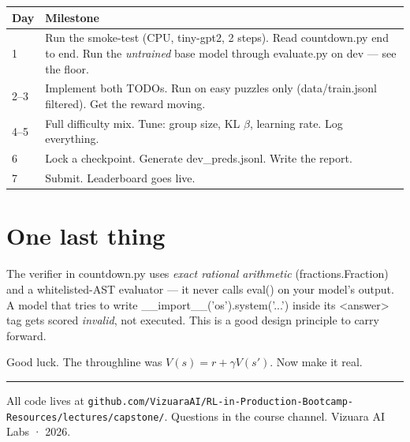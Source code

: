 \documentclass[11pt]{article}
\newcommand{\codesm}[1]{{\ttfamily\footnotesize #1}}
\begin{document}
\begin{center}
\renewcommand{\arraystretch}{1.32}
\begin{tabular}{l p{11cm}}
\toprule
\textbf{Day} & \textbf{Milestone} \\
\midrule
1 & Run the smoke-test (CPU, tiny-gpt2, 2 steps). Read \codesm{countdown.py} end to end.
    Run the \emph{untrained} base model through \codesm{evaluate.py} on dev --- see the floor. \\
2--3 & Implement both TODOs. Run on easy puzzles only (\codesm{data/train.jsonl} filtered).
       Get the reward moving. \\
4--5 & Full difficulty mix. Tune: group size, KL $\beta$, learning rate. Log everything. \\
6 & Lock a checkpoint. Generate \codesm{dev\_preds.jsonl}. Write the report. \\
7 & Submit. Leaderboard goes live. \\
\bottomrule
\end{tabular}
\end{center}

\section*{One last thing}

\vfill
The verifier in \codesm{countdown.py} uses \emph{exact rational arithmetic} (\codesm{fractions.Fraction})
and a whitelisted-AST evaluator --- it never calls \codesm{eval()} on your model's output.
A model that tries to write \codesm{\_\_import\_\_('os').system('...')} inside its \codesm{<answer>}
tag gets scored \emph{invalid}, not executed.
This is a good design principle to carry forward.

Good luck.
The throughline was $V(s) = r + \gamma V(s')$.
Now make it real.

\vspace{0.5cm}
{\color{ink3}\rule{\textwidth}{0.4pt}}
\vspace{0.1cm}
{\sans\footnotesize\color{ink3}
All code lives at \texttt{github.com/VizuaraAI/RL-in-Production-Bootcamp-Resources/lectures/capstone/}.
Questions in the course channel. \quad Vizuara AI Labs · 2026.}
\end{document}
